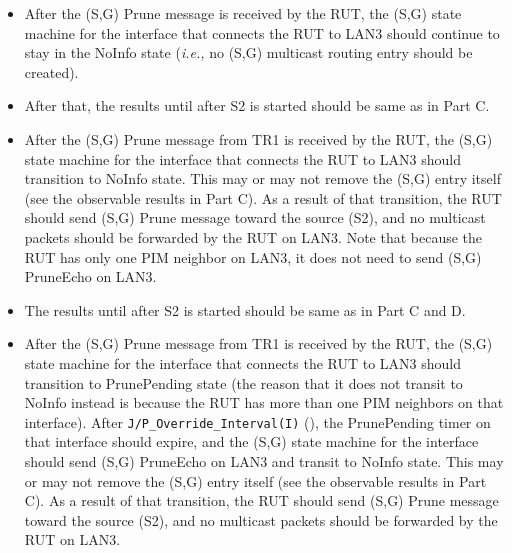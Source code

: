 \documentclass[11pt]{report}
\newcommand{\ie}{\emph{i.e.,}\xspace}
\begin{document}
\begin{itemize}

  \item After the (S,G) Prune message is received by the RUT,
  the (S,G) state machine for the interface that connects the RUT to
  LAN3 should continue to stay in the NoInfo state (\ie no (S,G) multicast
  routing entry should be created).

  \item After that, the results until after S2 is started should be same as in
  Part C.

  \item After the (S,G) Prune message from TR1 is received by the RUT,
  the (S,G) state machine for the interface that connects the RUT to
  LAN3 should transition to NoInfo state. This may or may not remove
  the (S,G) entry itself (see the observable results in Part C).
  As a result of that transition, the RUT should send (S,G) Prune
  message toward the source (S2), and no multicast packets should be
  forwarded by the RUT on LAN3. Note that because the RUT has only one
  PIM neighbor on LAN3, it does not need to send (S,G) PruneEcho on
  LAN3.

\end{itemize}


\begin{itemize}

  \item The results until after S2 is started should be same as in
  Part C and D.

  \item After the (S,G) Prune message from TR1 is received by the RUT,
  the (S,G) state machine for the interface that connects the RUT to
  LAN3 should transition to PrunePending state (the reason that it does
  not transit to NoInfo instead is because the RUT has more than one PIM
  neighbors on that interface).
  After \verb=J/P_Override_Interval(I)= (\PimsmJPOverrideIntervalI),
  the PrunePending timer on that interface should expire, and the
  (S,G) state machine for the interface should send (S,G) PruneEcho
  on LAN3 and transit to NoInfo
  state. This may or may not remove the (S,G) entry itself (see the observable
  results in Part C).
  As a result of that transition, the RUT should send (S,G) Prune
  message toward the source (S2), and no multicast packets should be
  forwarded by the RUT on LAN3.

\end{itemize}
\end{document}
